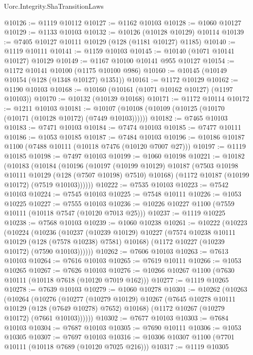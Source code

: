 \begin{lexlean}{Uorc.Integrity.ShaTransitionLaws}
\begin{coremodule}
@10126 := @1119 @10112
@10127 := @1162 @10103
@10128 := @1060 @10127
@10129 := @1133 @10103
@10132 := @10126 (@10128 @10129) @10114
@10139 := @7405 @10127 @10111 @10129 (@128 (@1181 @10127) @1185)
@10140 := @1119 @10111
@10141 := @1159 @10103
@10145 := @10140 (@1071 @10141 @10127) @10129
@10149 := @1167 @10100 @10141 @955 @10127
@10154 := @1172 @10141 @10100 (@1175 @10100 @986)
@10160 := @10145 (@10149 @10154 (@128 (@1348 @10127) @1351))
@10161 := @1172 @10129
@10162 := @1190 @10103
@10168 := @10160 (@10161 (@1071 @10162 @10127) (@1197 @10103))
@10170 := @10132 (@10139 @10168)
@10171 := @1172 @10114
@10172 := @1211 @10103
@10181 := @10107 (@10108 (@10109 (@10125 (@10170 (@10171 (@10128 @10172) (@7449 @10103))))))
@10182 := @7465 @10103
@10183 := @7471 @10103
@10184 := @7474 @10103
@10185 := @7477 @10111
@10186 := @1053 @10185
@10187 := @7484 @10103
@10196 := @10186 @10187 @1100 (@7488 @10111 (@10118 @7476 (@10120 @7007 @27)))
@10197 := @1119 @10185
@10198 := @7497 @10103
@10199 := @1060 @10198
@10221 := @10182
    (@10183
      (@10184
        (@10196
          (@10197
            (@10199 @10129)
            @10187
            (@7503 @10198 @10111 @10129 (@128 (@7507 @10198) @7510) @10168)
            (@1172 @10187 (@10199 @10172) (@7519 @10103))))))
@10222 := @7535 @10103
@10223 := @7542 @10103
@10224 := @7545 @10103
@10225 := @7548 @10111
@10226 := @1053 @10225
@10227 := @7555 @10103
@10236 := @10226 @10227 @1100 (@7559 @10111 (@10118 @7547 (@10120 @7013 @25)))
@10237 := @1119 @10225
@10238 := @7568 @10103
@10239 := @1060 @10238
@10261 := @10222
    (@10223
      (@10224
        (@10236
          (@10237
            (@10239 @10129)
            @10227
            (@7574 @10238 @10111 @10129 (@128 (@7578 @10238) @7581) @10168)
            (@1172 @10227 (@10239 @10172) (@7590 @10103))))))
@10262 := @7606 @10103
@10263 := @7613 @10103
@10264 := @7616 @10103
@10265 := @7619 @10111
@10266 := @1053 @10265
@10267 := @7626 @10103
@10276 := @10266 @10267 @1100 (@7630 @10111 (@10118 @7618 (@10120 @7019 @162)))
@10277 := @1119 @10265
@10278 := @7639 @10103
@10279 := @1060 @10278
@10301 := @10262
    (@10263
      (@10264
        (@10276
          (@10277
            (@10279 @10129)
            @10267
            (@7645 @10278 @10111 @10129 (@128 (@7649 @10278) @7652) @10168)
            (@1172 @10267 (@10279 @10172) (@7661 @10103))))))
@10302 := @7677 @10103
@10303 := @7684 @10103
@10304 := @7687 @10103
@10305 := @7690 @10111
@10306 := @1053 @10305
@10307 := @7697 @10103
@10316 := @10306 @10307 @1100 (@7701 @10111 (@10118 @7689 (@10120 @7025 @216)))
@10317 := @1119 @10305

\end{coremodule}
\end{lexlean}
